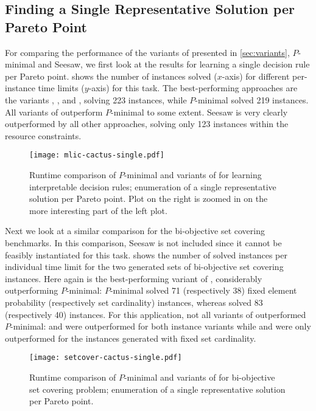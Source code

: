 \subsection{Finding a Single Representative Solution per Pareto Point}

For comparing the performance of the variants of \algname{} presented in \cref{sec:variants}, $P$-minimal and Seesaw, we first look at the results for learning a single decision rule per Pareto point.
 shows the number of instances solved ($x$-axis) for different per-instance time limits ($y$-axis) for this task.
The best-performing approaches are the \algname{} variants \msh{}, \satunsat{}, \unsatsat{} and \msu{}, solving 223 instances, while $P$-minimal solved 219 instances.
All variants of \algname{} outperform $P$-minimal to some extent.
Seesaw is very clearly outperformed by all other approaches, solving only 123 instances within the resource constraints.

\begin{figure}
    \centering
    \texttt{[image: mlic-cactus-single.pdf]}
    \caption{Runtime comparison of $P$-minimal and variants of \algname{} for learning interpretable decision rules;
      enumeration of a single representative solution per Pareto point.
      Plot on the right is zoomed in on the more interesting part of the left plot.
    }\label{fig:mlic-cactus-single}
\end{figure}

Next we look at a similar comparison for the bi-objective set covering benchmarks.
In this comparison, Seesaw is not included since it cannot be feasibly instantiated for this task.
 shows the number of solved instances per individual time limit for the two generated sets of bi-objective set covering instances.
Here again \msh{} is the best-performing variant of \algname{}, considerably outperforming $P$-minimal:
$P$-minimal solved 71 (respectively 38) fixed element probability (respectively set cardinality) instances, whereas \msh{} solved 83 (respectively 40) instances.
For this application, not all variants of \algname{} outperformed $P$-minimal:
\msu{} and \oll{} were outperformed for both instance variants while \satunsat{} and \unsatsat{} were only outperformed for the instances generated with fixed set cardinality.

\begin{figure}
    \centering
    \texttt{[image: setcover-cactus-single.pdf]}
    \caption{Runtime comparison of $P$-minimal and variants of \algname{} for bi-objective set covering problem;
      enumeration of a single representative solution per Pareto point.
    }\label{fig:setcover-cactus-single}
\end{figure}

